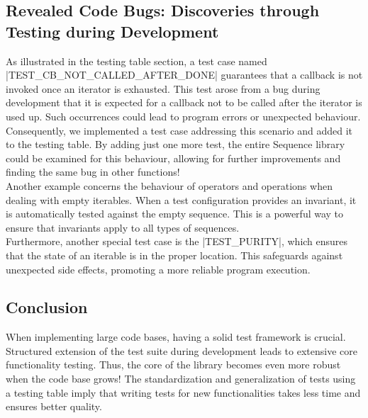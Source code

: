 \subsection{Revealed Code Bugs: Discoveries through Testing during Development}
\label{sub:Revealed Code Bugs: Discoveries through Testing during Development}
As illustrated in the testing table section, a test case named
|TEST_CB_NOT_CALLED_AFTER_DONE| guarantees that a callback is not invoked once
an iterator is exhausted. This test arose from a bug during development
that it is expected for a callback not to be called after the iterator is used
up. Such occurrences could lead to program errors or unexpected behaviour.
Consequently, we implemented a test case addressing this scenario and added it
to the testing table. By adding just one more test, the entire Sequence library
could be examined for this behaviour, allowing for further improvements and
finding the same bug in other functions!\\
Another example concerns the behaviour of operators and operations when dealing
with empty iterables. When a test configuration provides an invariant,
it is automatically tested against the empty sequence. This is a powerful way
to ensure that invariants apply to all types of sequences.\\
Furthermore, another special test case is the |TEST_PURITY|, which ensures that
the state of an iterable is in the proper location. This safeguards against
unexpected side effects, promoting a more reliable program execution.

\subsection{Conclusion}
\label{sub:Conclusion}
When implementing large code bases, having a solid test framework is crucial.
Structured extension of the test suite during development leads to extensive
core functionality testing. Thus, the core of the library becomes even more
robust when the code base grows!
\newline
The standardization and generalization of tests using a testing table imply that
writing tests for new functionalities takes less time and ensures better
quality.
